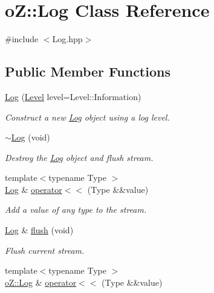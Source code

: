 \hypertarget{classo_z_1_1_log}{}\section{oZ\+::Log Class Reference}
\label{classo_z_1_1_log}


{\ttfamily \#include $<$Log.\+hpp$>$}

\subsection*{Public Member Functions}
\begin{DoxyCompactItemize}
\item 
\mbox{\hyperlink{classo_z_1_1_log_a0f33f010674a2df29d7187bc7a433db2}{Log}} (\mbox{\hyperlink{namespaceo_z_a72fc7662d5f07391ac6f0a5699014bfa}{Level}} level=Level\+::\+Information)
\begin{DoxyCompactList}\small\item\em Construct a new \mbox{\hyperlink{classo_z_1_1_log}{Log}} object using a log level. \end{DoxyCompactList}\item 
\mbox{\hyperlink{classo_z_1_1_log_a28d6db7c25427e63d38eebfc05290b52}{$\sim$\+Log}} (void)
\begin{DoxyCompactList}\small\item\em Destroy the \mbox{\hyperlink{classo_z_1_1_log}{Log}} object and flush stream. \end{DoxyCompactList}\item 
{\footnotesize template$<$typename Type $>$ }\\\mbox{\hyperlink{classo_z_1_1_log}{Log}} \& \mbox{\hyperlink{classo_z_1_1_log_a0cb4c3c614b1d5ae6285aecb31554fb4}{operator$<$$<$}} (Type \&\&value)
\begin{DoxyCompactList}\small\item\em Add a value of any type to the stream. \end{DoxyCompactList}\item 
\mbox{\hyperlink{classo_z_1_1_log}{Log}} \& \mbox{\hyperlink{classo_z_1_1_log_a41c8972eca682eb2701126b43a2f9099}{flush}} (void)
\begin{DoxyCompactList}\small\item\em Flush current stream. \end{DoxyCompactList}\item 
{\footnotesize template$<$typename Type $>$ }\\\mbox{\hyperlink{classo_z_1_1_log}{o\+Z\+::\+Log}} \& \mbox{\hyperlink{classo_z_1_1_log_ab4b6199f686c0b32f40be8885fca9db0}{operator$<$$<$}} (Type \&\&value)
\end{DoxyCompactItemize}
